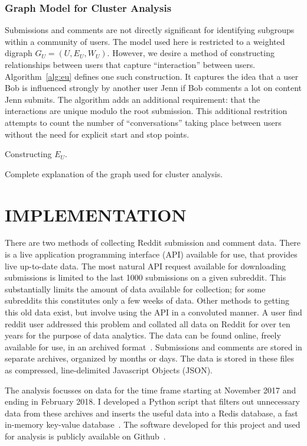 \documentclass[letterpaper, 10 pt, conference]{ieeeconf}
\theoremstyle{definition}
\newcommand{\red}{\color{red}}
\begin{document}
\subsubsection{Graph Model for Cluster Analysis}
Submissions and comments are not directly significant for identifying subgroups within a community of users. The model used here is restricted to a weighted digraph \(G_U = (U, E_U, W_U).\) However, we desire a method of constructing relationships between users that capture ``interaction'' between users. Algorithm~\ref{alg:eu} defines one such construction. It captures the idea that a user Bob is influenced strongly by another user Jenn if Bob comments a lot on content Jenn submits. The algorithm adds an additional requirement: that the interactions are unique modulo the root submission. This additional restrition attempts to count the number of ``conversations'' taking place between users without the need for explicit start and stop points.
\begin{algorithm}
  \caption{Constructing \(E_U.\)}
  \label{alg:eu}
\end{algorithm}
{\red Complete explanation of the graph used for cluster analysis.}

\section{IMPLEMENTATION}
There are two methods of collecting Reddit submission and comment data. There is a live application programming interface (API) available for use, that provides live up-to-date data. The most natural API request available for downloading submissions is limited to the last 1000 submissions on a given subreddit. This substantially limits the amount of data available for collection; for some subreddits this constitutes only a few weeks of data. Other methods to getting this old data exist, but involve using the API in a convoluted manner. A user {\red find reddit user} addressed this problem and collated all data on Reddit for over ten years for the purpose of data analytics. The data can be found online, freely available for use, in an archived format~\cite{Software:RedditArchive}. Submissions and comments are stored in separate archives, organized by months or days. The data is stored in these files as compressed, line-delimited Javascript Objects (JSON).

The analysis focusses on data for the time frame starting at November 2017 and ending in February 2018. I developed a Python script that filters out unnecessary data from these archives and inserts the useful data into a Redis database, a fast in-memory key-value database~\cite{Software:Redis}. The software developed for this project and used for analysis is publicly available on Github~\cite{Software:Mine}.
\end{document}
